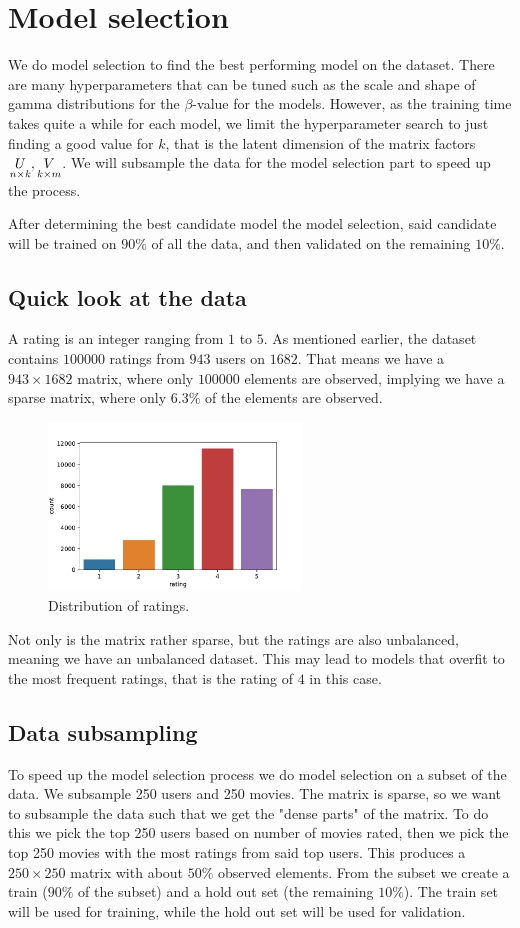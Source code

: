 \documentclass[12pt]{article}
\begin{document}
\section{Model selection}
We do model selection to find the best performing model on the dataset. There are many hyperparameters that can be tuned such as the scale and shape of gamma distributions for the $\beta$-value for the models. However, as the training time takes quite a while for each model, we limit the hyperparameter search to just finding a good value for $k$, that is the latent dimension of the matrix factors $\underset{n \times k}{U}, \underset{k \times m}{V}$. We will subsample the data for the model selection part to speed up the process.

After determining the best candidate model the model selection, said candidate will be trained on $90\%$ of all the data, and then validated on the remaining $10\%$.

    \subsection*{Quick look at the data}
    A rating is an integer ranging from $1$ to $5$. As mentioned earlier, the dataset contains $100 000$ ratings from $943$ users on $1682$. That means we have a $943 \times 1682$ matrix, where only $100000$ elements are observed, implying we have a sparse matrix, where only $6.3\%$ of the elements are observed.  
    \begin{figure}[H]
        \centering
        \caption{Distribution of ratings.}
        \includegraphics[width=0.6\textwidth]{ratings.pdf}
    \end{figure}
    Not only is the matrix rather sparse, but the ratings are also unbalanced, meaning we have an unbalanced dataset. This may lead to models that overfit to the most frequent ratings, that is the rating of $4$ in this case.

    \subsection{Data subsampling}
    To speed up the model selection process we do model selection on a subset of the data. We subsample 250 users and 250 movies. The matrix is sparse, so we want to subsample the data such that we get the "dense parts" of the matrix. To do this we pick the top 250 users based on number of movies rated, then we pick the top 250 movies with the most ratings from said top users. This produces a $250 \times 250$ matrix with about $50\%$ observed elements. From the subset we create a train ($90\%$ of the subset) and a hold out set (the remaining $10\%$). The train set will be used for training, while the hold out set will be used for validation.
\end{document}
